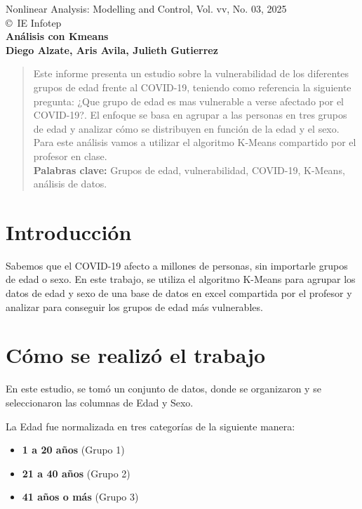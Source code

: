 \documentclass[a4paper, 10pt]{article}
\begin{document}
\begin{center}
Nonlinear Analysis: Modelling and Control, Vol. vv, No. 03, 2025\\
\copyright\ IE Infotep\\[24pt]
\LARGE
\textbf{Análisis con Kmeans}\\[6pt]
\small
\textbf {Diego Alzate, Aris Avila, Julieth Gutierrez}\\[6pt]
\end{center}

\begin{abstract}
Este informe presenta un estudio sobre la vulnerabilidad de los diferentes grupos de edad frente al COVID-19, teniendo como referencia la siguiente pregunta: ¿Que grupo de edad es mas vulnerable a verse afectado por el COVID-19?. El enfoque se basa en agrupar a las personas en tres grupos de edad y analizar cómo se distribuyen en función de la edad y el sexo. Para este análisis vamos a utilizar el algoritmo K-Means compartido por el profesor en clase.\\

\textbf{Palabras clave:} Grupos de edad, vulnerabilidad, COVID-19, K-Means, análisis de datos.
\end{abstract}

\section{Introducción}\label{s:1}
Sabemos que el COVID-19 afecto a millones de personas, sin importarle grupos de edad o sexo. En este trabajo, se utiliza el algoritmo K-Means para agrupar los datos de edad y sexo de una base de datos en excel compartida por el profesor y analizar para conseguir los grupos de edad más vulnerables.

\section{Cómo se realizó el trabajo}\label{s:2}
En este estudio, se tomó un conjunto de datos, donde se organizaron y se seleccionaron las columnas de Edad y Sexo. 

La Edad fue normalizada en tres categorías de la siguiente manera:

\begin{itemize}
    \item \textbf{1 a 20 años} (Grupo 1)
    \item \textbf{21 a 40 años} (Grupo 2)
    \item \textbf{41 años o más} (Grupo 3)
\end{itemize}
\end{document}
